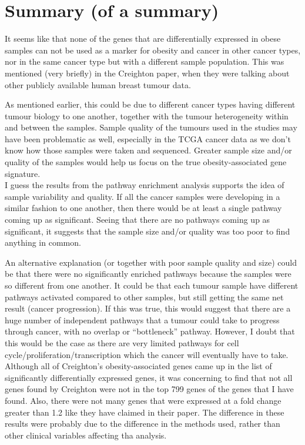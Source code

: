 \documentclass[a4paper, 11pt]{article}
\begin{document}
\section*{Summary (of a summary)}

It seems like that none of the genes that are differentially expressed in obese samples can not be used as a marker for obesity and cancer in other cancer types, nor in the same cancer type but with a different sample population.
This was mentioned (very briefly) in the Creighton paper, when they were talking about other publicly available human breast tumour data.

As mentioned earlier, this could be due to different cancer types having different tumour biology to one another, together with the tumour heterogeneity within and between the samples.
Sample quality of the tumours used in the studies may have been problematic as well, especially in the TCGA cancer data as we don't know how those samples were taken and sequenced.
Greater sample size and/or quality of the samples would help us focus on the true obesity-associated gene signature.\\

I guess the results from the pathway enrichment analysis supports the idea of sample variability and quality.
If all the cancer samples were developing in a similar fashion to one another, then there would be at least a single pathway coming up as significant.
Seeing that there are no pathways coming up as significant, it suggests that the sample size and/or quality was too poor to find anything in common.

An alternative explanation (or together with poor sample quality and size) could be that there were no significantly enriched pathways because the samples were so different from one another.
It could be that each tumour sample have different pathways activated compared to other samples, but still getting the same net result (cancer progression).
If this was true, this would suggest that there are a huge number of independent pathways that a tumour could take to progress through cancer, with no overlap or ``bottleneck'' pathway.
However, I doubt that this would be the case as there are very limited pathways for cell cycle/proliferation/transcription which the cancer will eventually have to take.\\

Although all of Creighton's obesity-associated genes came up in the list of significantly differentially expressed genes, it was concerning to find that not all genes found by Creighton were not in the top 799 genes of the genes that I have found.
Also, there were not many genes that were expressed at a fold change greater than 1.2 like they have claimed in their paper.
The difference in these results were probably due to the difference in the methods used, rather than other clinical variables affecting tha analysis.
\end{document}
